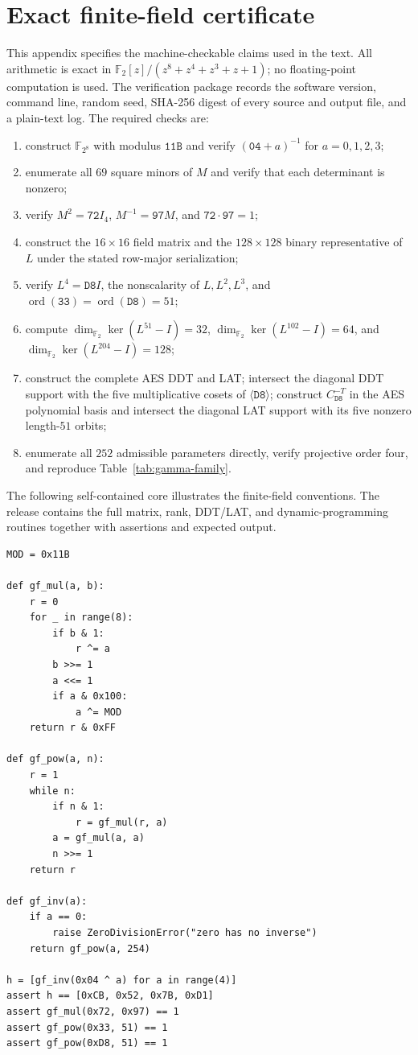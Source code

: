 \documentclass[10pt,reqno]{amsart}
\theoremstyle{plain}
\theoremstyle{remark}\newtheorem{remark}[theorem]{Remark}
\theoremstyle{definition}\newtheorem{definition}[theorem]{Definition}
\newcommand{\F}{\mathbb F}
\newcommand{\ord}{\operatorname{ord}}
\newcommand{\hex}[1]{\mathtt{#1}}
\begin{document}
\section{Exact finite-field certificate}\label{app:certificate}
This appendix specifies the machine-checkable claims used in the text. All arithmetic is exact in $\F_2[z]/(z^8+z^4+z^3+z+1)$; no floating-point computation is used. The verification package records the software version, command line, random seed, SHA-256 digest of every source and output file, and a plain-text log. The required checks are:
\begin{enumerate}[label=(A\arabic*)]
\item construct $\F_{2^8}$ with modulus $\hex{11B}$ and verify $(\hex{04}+a)^{-1}$ for $a=0,1,2,3$;
\item enumerate all $69$ square minors of $M$ and verify that each determinant is nonzero;
\item verify $M^2=\hex{72}I_4$, $M^{-1}=\hex{97}M$, and $\hex{72}\cdot\hex{97}=1$;
\item construct the $16\times16$ field matrix and the $128\times128$ binary representative of $L$ under the stated row-major serialization;
\item verify $L^4=\hex{D8}I$, the nonscalarity of $L,L^2,L^3$, and $\ord(\hex{33})=\ord(\hex{D8})=51$;
\item compute $\dim_{\F_2}\ker(L^{51}-I)=32$, $\dim_{\F_2}\ker(L^{102}-I)=64$, and $\dim_{\F_2}\ker(L^{204}-I)=128$;
\item construct the complete AES DDT and LAT; intersect the diagonal DDT support with the five multiplicative cosets of $\langle\hex{D8}\rangle$; construct $C_{\hex{D8}}^{-T}$ in the AES polynomial basis and intersect the diagonal LAT support with its five nonzero length-$51$ orbits;
\item enumerate all $252$ admissible parameters directly, verify projective order four, and reproduce Table~\ref{tab:gamma-family}.
\end{enumerate}

The following self-contained core illustrates the finite-field conventions. The release contains the full matrix, rank, DDT/LAT, and dynamic-programming routines together with assertions and expected output.
\begin{lstlisting}[caption={Core finite-field operations used by the certificate.},label={lst:gf-core}]
MOD = 0x11B

def gf_mul(a, b):
    r = 0
    for _ in range(8):
        if b & 1:
            r ^= a
        b >>= 1
        a <<= 1
        if a & 0x100:
            a ^= MOD
    return r & 0xFF

def gf_pow(a, n):
    r = 1
    while n:
        if n & 1:
            r = gf_mul(r, a)
        a = gf_mul(a, a)
        n >>= 1
    return r

def gf_inv(a):
    if a == 0:
        raise ZeroDivisionError("zero has no inverse")
    return gf_pow(a, 254)

h = [gf_inv(0x04 ^ a) for a in range(4)]
assert h == [0xCB, 0x52, 0x7B, 0xD1]
assert gf_mul(0x72, 0x97) == 1
assert gf_pow(0x33, 51) == 1
assert gf_pow(0xD8, 51) == 1
\end{lstlisting}
\end{document}
